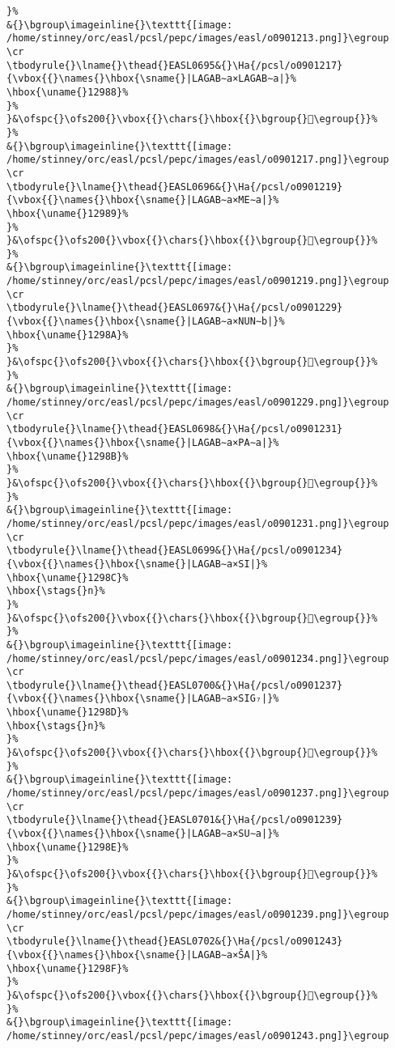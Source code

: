 \begin{verbatim}
}%
&{}\bgroup\imageinline{}\texttt{[image: /home/stinney/orc/easl/pcsl/pepc/images/easl/o0901213.png]}\egroup
\cr
\tbodyrule{}\lname{}\thead{}EASL0695&{}\Ha{/pcsl/o0901217}{\vbox{{}\names{}\hbox{\sname{}|LAGAB∼a×LAGAB∼a|}%
\hbox{\uname{}12988}%
}%
}&\ofspc{}\ofs200{}\vbox{{}\chars{}\hbox{{}\bgroup{}𒦈\egroup{}}%
}%
&{}\bgroup\imageinline{}\texttt{[image: /home/stinney/orc/easl/pcsl/pepc/images/easl/o0901217.png]}\egroup
\cr
\tbodyrule{}\lname{}\thead{}EASL0696&{}\Ha{/pcsl/o0901219}{\vbox{{}\names{}\hbox{\sname{}|LAGAB∼a×ME∼a|}%
\hbox{\uname{}12989}%
}%
}&\ofspc{}\ofs200{}\vbox{{}\chars{}\hbox{{}\bgroup{}𒦉\egroup{}}%
}%
&{}\bgroup\imageinline{}\texttt{[image: /home/stinney/orc/easl/pcsl/pepc/images/easl/o0901219.png]}\egroup
\cr
\tbodyrule{}\lname{}\thead{}EASL0697&{}\Ha{/pcsl/o0901229}{\vbox{{}\names{}\hbox{\sname{}|LAGAB∼a×NUN∼b|}%
\hbox{\uname{}1298A}%
}%
}&\ofspc{}\ofs200{}\vbox{{}\chars{}\hbox{{}\bgroup{}𒦊\egroup{}}%
}%
&{}\bgroup\imageinline{}\texttt{[image: /home/stinney/orc/easl/pcsl/pepc/images/easl/o0901229.png]}\egroup
\cr
\tbodyrule{}\lname{}\thead{}EASL0698&{}\Ha{/pcsl/o0901231}{\vbox{{}\names{}\hbox{\sname{}|LAGAB∼a×PA∼a|}%
\hbox{\uname{}1298B}%
}%
}&\ofspc{}\ofs200{}\vbox{{}\chars{}\hbox{{}\bgroup{}𒦋\egroup{}}%
}%
&{}\bgroup\imageinline{}\texttt{[image: /home/stinney/orc/easl/pcsl/pepc/images/easl/o0901231.png]}\egroup
\cr
\tbodyrule{}\lname{}\thead{}EASL0699&{}\Ha{/pcsl/o0901234}{\vbox{{}\names{}\hbox{\sname{}|LAGAB∼a×SI|}%
\hbox{\uname{}1298C}%
\hbox{\stags{}n}%
}%
}&\ofspc{}\ofs200{}\vbox{{}\chars{}\hbox{{}\bgroup{}𒦌\egroup{}}%
}%
&{}\bgroup\imageinline{}\texttt{[image: /home/stinney/orc/easl/pcsl/pepc/images/easl/o0901234.png]}\egroup
\cr
\tbodyrule{}\lname{}\thead{}EASL0700&{}\Ha{/pcsl/o0901237}{\vbox{{}\names{}\hbox{\sname{}|LAGAB∼a×SIG₇|}%
\hbox{\uname{}1298D}%
\hbox{\stags{}n}%
}%
}&\ofspc{}\ofs200{}\vbox{{}\chars{}\hbox{{}\bgroup{}𒦍\egroup{}}%
}%
&{}\bgroup\imageinline{}\texttt{[image: /home/stinney/orc/easl/pcsl/pepc/images/easl/o0901237.png]}\egroup
\cr
\tbodyrule{}\lname{}\thead{}EASL0701&{}\Ha{/pcsl/o0901239}{\vbox{{}\names{}\hbox{\sname{}|LAGAB∼a×SU∼a|}%
\hbox{\uname{}1298E}%
}%
}&\ofspc{}\ofs200{}\vbox{{}\chars{}\hbox{{}\bgroup{}𒦎\egroup{}}%
}%
&{}\bgroup\imageinline{}\texttt{[image: /home/stinney/orc/easl/pcsl/pepc/images/easl/o0901239.png]}\egroup
\cr
\tbodyrule{}\lname{}\thead{}EASL0702&{}\Ha{/pcsl/o0901243}{\vbox{{}\names{}\hbox{\sname{}|LAGAB∼a×ŠA|}%
\hbox{\uname{}1298F}%
}%
}&\ofspc{}\ofs200{}\vbox{{}\chars{}\hbox{{}\bgroup{}𒦏\egroup{}}%
}%
&{}\bgroup\imageinline{}\texttt{[image: /home/stinney/orc/easl/pcsl/pepc/images/easl/o0901243.png]}\egroup

\end{verbatim}
